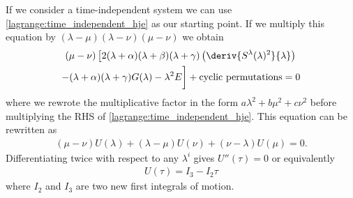    If we consider a time-independent system we can use \ref{lagrange:time_independent_hje} as our starting point. If we multiply this equation by $(\lambda - \mu)(\lambda - \nu)(\mu - \nu)$ we obtain
    \begin{multline}
        (\mu - \nu)\left[2(\lambda + \alpha)(\lambda + \beta)(\lambda + \gamma)\left(\deriv{S^\lambda(\lambda)^2}{\lambda}\right)\right.\\ - (\lambda + \alpha)(\lambda + \gamma)G(\lambda) - \lambda^2E \bigg] + \text{cyclic permutations} = 0
    \end{multline}
    where we rewrote the multiplicative factor in the form $a\lambda^2 + b\mu^2 + c\nu^2$ before multiplying the RHS of \ref{lagrange:time_independent_hje}. This equation can be rewritten as
    \begin{gather}
        (\mu-\nu)U(\lambda) + (\lambda - \mu)U(\nu) + (\nu - \lambda)U(\mu) = 0.
    \end{gather}
    Differentiating twice with respect to any $\lambda^i$ gives $U''(\tau) = 0$ or equivalently
    \begin{gather}
        U(\tau) = I_3 - I_2\tau
    \end{gather}
    where $I_2$ and $I_3$ are two new first integrals of motion.

